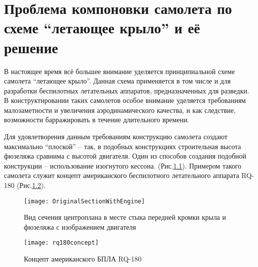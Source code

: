 \chapter{Проблема компоновки самолета по схеме ``летающее крыло'' и её решение}

В настоящее время всё большее внимание уделяется принципиальной схеме самолета ``летающее крыло''. Данная схема применяется в том числе и для разработки беспилотных летательных аппаратов, предназначенных для разведки. В конструктировании таких самолетов особое внимание уделяется требованиям малозаметности и увеличения аэродинамического качества, и как следствие, возможности барражировать в течение длительного времени. 

Для удовлетворения данным требованиям конструкцию самолета создают максимально ``плоской'' -- так, в подобных конструкциях строительная высота фюзеляжа сравнима с высотой двигателя. Один из способов создания подобной конструкции -- использование изогнутого кессона. (Рис.\ref{fig:OriginalSectionWithEngine}). Примером такого самолета служит концепт американского беспилотного летательного аппарата RQ-180 (Рис.\ref{fig:rq180}). 

\begin{figure}[ht]
\centering
\texttt{[image: OriginalSectionWithEngine]}
\caption{Вид сечения центроплана в месте стыка передней кромки крыла и фюзеляжа с изображением двигателя}
\label{fig:OriginalSectionWithEngine}
\end{figure}

\begin{figure}[ht]
\centering
\texttt{[image: rq180concept]}
\caption{Концепт американского БПЛА RQ-180 \cite{AvWeekUAV}}
\label{fig:rq180}
\end{figure}







